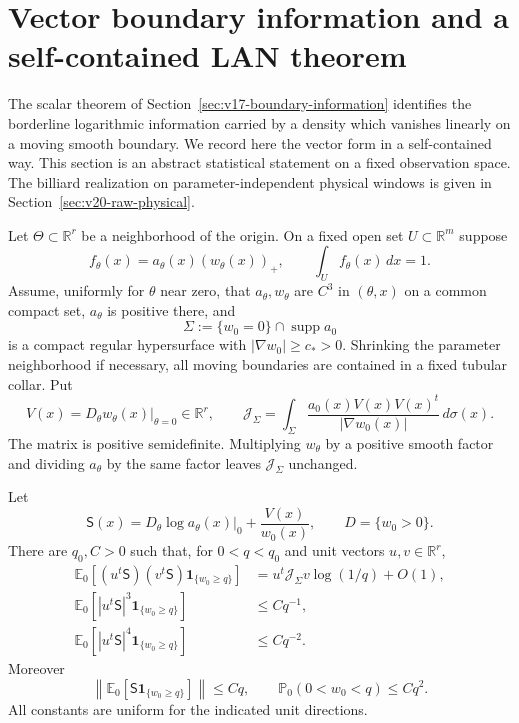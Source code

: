 \section{Vector boundary information and a self-contained LAN theorem}
\label{sec:v20-vector-information}

The scalar theorem of Section~\ref{sec:v17-boundary-information} identifies the
borderline logarithmic information carried by a density which vanishes linearly
on a moving smooth boundary.  We record here the vector form in a self-contained
way.  This section is an abstract statistical statement on a fixed observation
space.  The billiard realization on parameter-independent physical windows is
given in Section~\ref{sec:v20-raw-physical}.

Let $\Theta\subset\mathbb R^r$ be a neighborhood of the origin.  On a fixed open
set $U\subset\mathbb R^m$ suppose
\begin{equation}\label{eq:v20-vector-density}
 f_\theta(x)=a_\theta(x)(w_\theta(x))_+,
 \qquad \int_U f_\theta(x)\,dx=1.
\end{equation}
Assume, uniformly for $\theta$ near zero, that $a_\theta,w_\theta$ are $C^3$ in
$(\theta,x)$ on a common compact set, $a_\theta$ is positive there, and
\[
 \Sigma:=\{w_0=0\}\cap\operatorname{supp}a_0
\]
is a compact regular hypersurface with $|\nabla w_0|\ge c_*>0$.  Shrinking the
parameter neighborhood if necessary, all moving boundaries are contained in a
fixed tubular collar.  Put
\begin{equation}\label{eq:v20-boundary-velocity-matrix}
 V(x)=D_\theta w_\theta(x)|_{\theta=0}\in\mathbb R^r,
 \qquad
 \mathcal J_\Sigma=
 \int_\Sigma\frac{a_0(x)V(x)V(x)^t}{|\nabla w_0(x)|}\,d\sigma(x).
\end{equation}
The matrix is positive semidefinite.  Multiplying $w_\theta$ by a positive
smooth factor and dividing $a_\theta$ by the same factor leaves
$\mathcal J_\Sigma$ unchanged.

\begin{lemma}
\label{lem:v20-vector-collar}
Let
\[
 \mathsf S(x)=D_\theta\log a_\theta(x)|_0+\frac{V(x)}{w_0(x)},
 \qquad D=\{w_0>0\}.
\]
There are $q_0,C>0$ such that, for $0<q<q_0$ and unit vectors
$u,v\in\mathbb R^r$,
\begin{align}
 \mathbb E_0[(u^t\mathsf S)(v^t\mathsf S)
       \mathbf 1_{\{w_0\ge q\}}]
 &=u^t\mathcal J_\Sigma v\log(1/q)+O(1),
                                      \label{eq:v20-vector-second}\\
 \mathbb E_0[|u^t\mathsf S|^3\mathbf 1_{\{w_0\ge q\}}]
 &\le Cq^{-1},                       \label{eq:v20-vector-third}\\
 \mathbb E_0[|u^t\mathsf S|^4\mathbf 1_{\{w_0\ge q\}}]
 &\le Cq^{-2}.                       \label{eq:v20-vector-fourth}
\end{align}
Moreover
\begin{equation}\label{eq:v20-vector-centering}
 \left\|\mathbb E_0[\mathsf S\mathbf 1_{\{w_0\ge q\}}]\right\|
 \le Cq,
 \qquad
 \mathbb P_0(0<w_0<q)\le Cq^2.
\end{equation}
All constants are uniform for the indicated unit directions.
\end{lemma}

